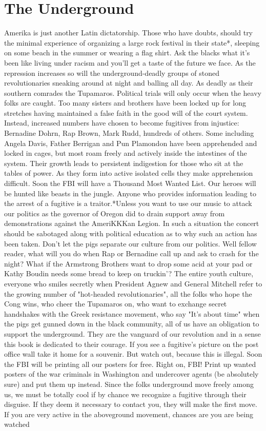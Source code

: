 \documentclass[11pt,twoside,a4paper]{book}
\begin{document}
\section{The Underground}

Amerika is just another Latin dictatorship. Those who have doubts, should try the minimal experience of organizing a large rock festival in their state*, sleeping on some beach in the summer or wearing a flag shirt. Ask the blacks what it's been like living under racism and you'll get a taste of the future we face. As the repression increases so will the underground-deadly groups of stoned revolutionaries sneaking around at night and balling all day. As deadly as their southern comrades the Tupamaros. Political trials will only occur when the heavy folks are caught. Too many sisters and brothers have been locked up for long stretches having maintained a false faith in the good will of the court system. Instead, increased numbers have chosen to become fugitives from injustice: Bernadine Dohrn, Rap Brown, Mark Rudd, hundreds of others. Some including Angela Davis, Father Berrigan and Pun Plamondon have been apprehended and locked in cages, but most roam freely and actively inside the intestines of the system. Their growth leads to persistent indigestion for those who sit at the tables of power. As they form into active isolated cells they make apprehension difficult. Soon the FBI will have a Thousand Most Wanted List. Our heroes will be hunted like beasts in the jungle. Anyone who provides information leading to the arrest of a fugitive is a traitor.*Unless you want to use our music to attack our politics as the governor of Oregon did to drain support away from demonstrations against the AmeriKKKan Legion. In such a situation the concert should be sabotaged along with political education as to why such an action has been taken. Don't let the pigs separate our culture from our politics. Well fellow reader, what will you do when Rap or Bernadine call up and ask to crash for the night? What if the Armstrong Brothers want to drop some acid at your pad or Kathy Boudin needs some bread to keep on truckin'? The entire youth culture, everyone who smiles secretly when President Agnew and General Mitchell refer to the growing number of "hot-headed revolutionaries", all the folks who hope the Cong wins, who cheer the Tupamaros on, who want to exchange secret handshakes with the Greek resistance movement, who say "It's about time" when the pigs get gunned down in the black community, all of us have an obligation to support the underground. They are the vanguard of our revolution and in a sense this book is dedicated to their courage. If you see a fugitive's picture on the post office wall take it home for a souvenir. But watch out, because this is illegal. Soon the FBI will be printing all our posters for free. Right on, FBI! Print up wanted posters of the war criminals in Washington and undercover agents (be absolutely sure) and put them up instead. Since the folks underground move freely among us, we must be totally cool if by chance we recognize a fugitive through their disguise. If they deem it necessary to contact you, they will make the first move. If you are very active in the aboveground movement, chances are you are being watched 
\end{document}
